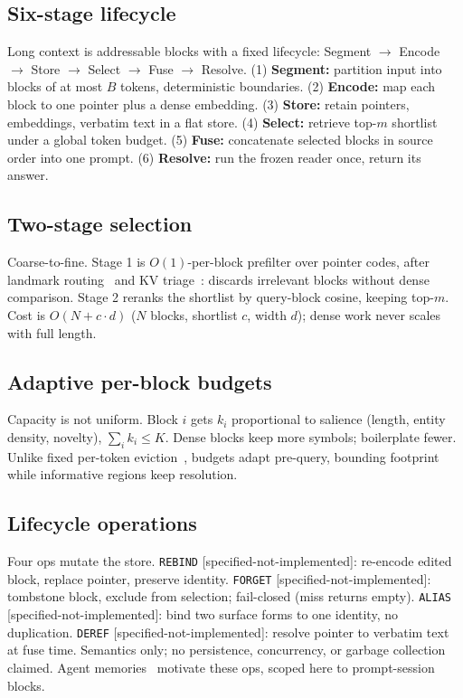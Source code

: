 \label{sec:arch}
\subsection{Six-stage lifecycle}
Long context is addressable blocks with a fixed lifecycle: Segment $\to$ Encode $\to$ Store $\to$ Select $\to$ Fuse $\to$ Resolve.
(1) \textbf{Segment:} partition input into blocks of at most $B$ tokens, deterministic boundaries.
(2) \textbf{Encode:} map each block to one pointer plus a dense embedding.
(3) \textbf{Store:} retain pointers, embeddings, verbatim text in a flat store.
(4) \textbf{Select:} retrieve top-$m$ shortlist under a global token budget.
(5) \textbf{Fuse:} concatenate selected blocks in source order into one prompt.
(6) \textbf{Resolve:} run the frozen reader once, return its answer.

\subsection{Two-stage selection}
Coarse-to-fine.
Stage 1 is $O(1)$-per-block prefilter over pointer codes, after landmark routing~\cite{mohtashami2023landmark} and KV triage~\cite{behnam2025rocketkv}: discards irrelevant blocks without dense comparison.
Stage 2 reranks the shortlist by query-block cosine, keeping top-$m$.
Cost is $O(N+c\cdot d)$ ($N$ blocks, shortlist $c$, width $d$); dense work never scales with full length.

\subsection{Adaptive per-block budgets}
Capacity is not uniform.
Block $i$ gets $k_i$ proportional to salience (length, entity density, novelty), $\sum_i k_i \le K$.
Dense blocks keep more symbols; boilerplate fewer.
Unlike fixed per-token eviction~\cite{li2024snapkv}, budgets adapt pre-query, bounding footprint while informative regions keep resolution.

\subsection{Lifecycle operations}
Four ops mutate the store.
\texttt{REBIND} [specified-not-implemented]: re-encode edited block, replace pointer, preserve identity.
\texttt{FORGET} [specified-not-implemented]: tombstone block, exclude from selection; fail-closed (miss returns empty).
\texttt{ALIAS} [specified-not-implemented]: bind two surface forms to one identity, no duplication.
\texttt{DEREF} [specified-not-implemented]: resolve pointer to verbatim text at fuse time.
Semantics only; no persistence, concurrency, or garbage collection claimed.
Agent memories~\cite{chhikara2025mem0,rasmussen2025zep,packer2023memgpt} motivate these ops, scoped here to prompt-session blocks.

